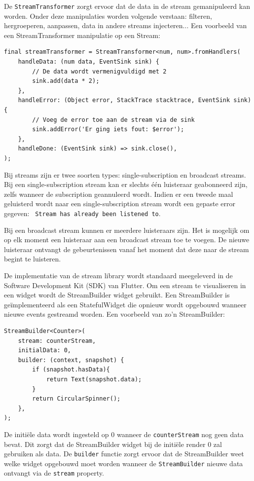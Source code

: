 De \verb|StreamTransformer| zorgt ervoor dat de data in de stream gemanipuleerd kan worden. Onder deze manipulaties worden volgende verstaan: filteren, hergroeperen, aanpassen, data in andere streams injecteren...
Een voorbeeld van een StreamTransformer manipulatie op een Stream:
 \begin{verbatim}
final streamTransformer = StreamTransformer<num, num>.fromHandlers(
    handleData: (num data, EventSink sink) {
        // De data wordt vermenigvuldigd met 2
        sink.add(data * 2);
    }, 
    handleError: (Object error, StackTrace stacktrace, EventSink sink) {
        // Voeg de error toe aan de stream via de sink
        sink.addError('Er ging iets fout: $error');
    }, 
    handleDone: (EventSink sink) => sink.close(),
);
\end{verbatim}

Bij streams zijn er twee soorten types: single-subscription en broadcast streams. Bij een single-subscription stream kan er slechts één luisteraar geabonneerd zijn, zelfs wanneer de subscription geannuleerd wordt. Indien er een tweede maal geluisterd wordt naar een single-subscription stream wordt een gepaste error gegeven: \verb| Stream has already been listened to|.

Bij een broadcast stream kunnen er meerdere luisteraars zijn. Het is mogelijk om op elk moment een luisteraar aan een broadcast stream toe te voegen. De nieuwe luisteraar ontvangt de gebeurtenissen vanaf het moment dat deze naar de stream begint te luisteren.

De implementatie van de stream library wordt standaard meegeleverd in de Software Development Kit (SDK) van Flutter. Om een stream te visualiseren in een widget wordt de StreamBuilder widget gebruikt. Een StreamBuilder is geïmplementeerd als een StatefulWidget die opnieuw wordt opgebouwd wanneer nieuwe events gestreamd worden.
Een voorbeeld van zo'n StreamBuilder:
\begin{verbatim}
StreamBuilder<Counter>(
    stream: counterStream,
    initialData: 0,
    builder: (context, snapshot) {
        if (snapshot.hasData){
            return Text(snapshot.data);
        }
        return CircularSpinner();
    },
);
\end{verbatim}
De initiële data wordt ingesteld op 0 wanneer de \verb|counterStream| nog geen data bevat. Dit zorgt dat de StreamBuilder widget bij de initiële render 0 zal gebruiken als data. De \verb|builder| functie zorgt ervoor dat de StreamBuilder weet welke widget opgebouwd moet worden wanneer de \verb|StreamBuilder| nieuwe data ontvangt via de \verb|stream| property.


